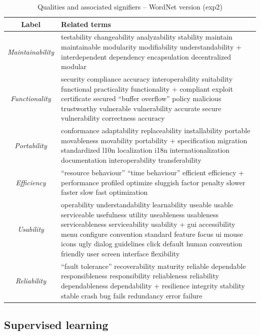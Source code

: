 \documentclass{acm_proc_article-sp}
\begin{document}
\begin{table}
	\centering
\begin{tabular}{c|p{9cm}}
\toprule
\textbf{Label} & \textbf{Related terms} \\
\midrule
\emph{Maintainability} &
testability changeability analyzability stability maintain maintainable modularity modifiability understandability + interdependent dependency encapsulation decentralized modular\\ \hline
\emph{Functionality} &
security compliance accuracy interoperability suitability functional practicality functionality + compliant exploit certificate secured “buffer overflow” policy malicious trustworthy vulnerable vulnerability accurate secure vulnerability correctness accuracy\\ \hline
\emph{Portability} &
conformance adaptability replaceability installability portable movableness movability portability + specification migration standardized l10n localization i18n internationalization documentation interoperability transferability\\ \hline
\emph{Efficiency} &
“resource behaviour” “time behaviour” efficient efficiency + performance profiled optimize sluggish factor penalty slower faster slow fast optimization\\ \hline
\emph{Usability} &
operability understandability learnability useable usable serviceable usefulness utility useableness usableness serviceableness serviceability usability + gui accessibility menu configure convention standard feature focus ui mouse icons ugly dialog guidelines click default human convention friendly user screen interface flexibility\\ \hline
\emph{Reliability} &
“fault tolerance” recoverability maturity reliable dependable responsibleness responsibility reliableness reliability dependableness dependability + resilience integrity stability stable crash bug fails redundancy error failure\\ 
\bottomrule
\end{tabular}
	\caption{Qualities and associated signifiers – WordNet version (\textsf{exp2})}
	\label{tbl:wnsig}

\end{table}

\subsection{Supervised learning}

\label{sec:suplearn}
\end{document}
